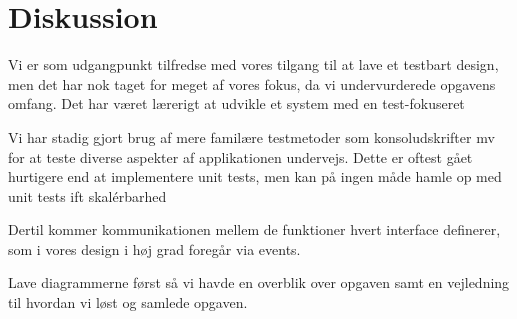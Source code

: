 
\section{Diskussion}
Vi er som udgangpunkt tilfredse med vores tilgang til at lave et testbart design, men det har nok taget for meget af vores fokus, da vi undervurderede opgavens omfang. 
Det har været lærerigt at udvikle et system med en test-fokuseret

Vi har stadig gjort brug af mere familære testmetoder som konsoludskrifter mv for at teste diverse aspekter af applikationen undervejs. 
Dette er oftest gået hurtigere end at implementere unit tests, men kan på ingen måde hamle op med unit tests ift skalérbarhed

Dertil kommer kommunikationen mellem de funktioner hvert interface definerer, som i vores design i høj grad foregår via events.

Lave diagrammerne først så vi havde en overblik over opgaven samt en vejledning til hvordan vi løst og samlede opgaven. 
